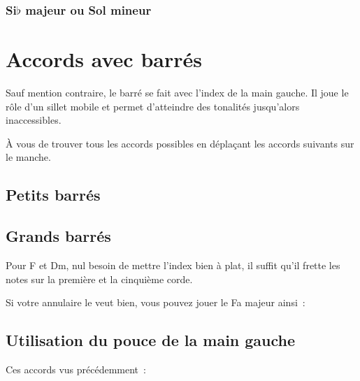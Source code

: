 \documentclass[11pt]{article}
\begin{document}

\subsubsection{Si$\flat$ majeur ou Sol mineur}


\section{Accords avec barrés}

Sauf mention contraire, le barré se fait avec l’index de la main gauche. Il
joue le rôle d’un sillet mobile et permet d’atteindre des tonalités jusqu’alors
inaccessibles.

À vous de trouver tous les accords possibles en déplaçant les accords suivants
sur le manche.

\subsection{Petits barrés}


\subsection{Grands barrés}



Pour F et Dm, nul besoin de mettre l’index bien à plat, il suffit qu’il
frette les notes sur la première et la cinquième corde.

Si votre annulaire le veut bien, vous pouvez jouer le Fa majeur ainsi~:


\subsection{Utilisation du pouce de la main gauche}

Ces accords vus précédemment~:
\end{document}
